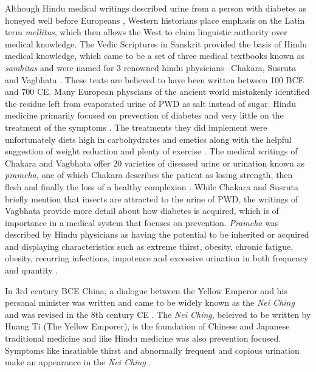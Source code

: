 \documentclass[12pt]{article}
\begin{document}
Although Hindu medical writings described urine from a person with diabetes as honeyed well before Europeans \citep{frank_1957_diabetes}, 
Western historians place emphasis on the Latin term \textit{mellitus}, which then allows the West to claim linguistic authority over medical knowledge. The Vedic Scriptures in Sanskrit provided the basis of Hindu medical knowledge, which came to be a set of three medical textbooks known as \textit{samhitas} and were named for 3 renowned hindu physicians-- Chakara, Susruta and Vagbhata \citep{frank_1957_diabetes}. These texts are believed to have been written between 100 BCE and 700 CE.  Many European physcians of the ancient world mistakenly identified the residue left from evaporated urine of PWD as salt instead of sugar. Hindu medicine primarily focused on prevention of diabetes and very little on the treatment of the symptoms \citep{frank_1957_diabetes}. The treatments they did implement were unfortunately diets high in carbohydrates and emetics along with the helpful suggestion of weight reduction and plenty of exercise \citep{sanders_2001_philatelic}. The medical writings of Chakara and Vagbhata offer 20 varieties of diseased urine or urination known as \textit{prameha}, one of which Chakara describes the patient as losing strength, then flesh and finally the loss of a healthy complexion \citep{frank_1957_diabetes}. While Chakara and Susruta briefly mention that insects are attracted to the urine of PWD, the writings of Vagbhata provide more detail about how diabetes is acquired, which is of importance in a medical system that focuses on prevention. \textit{Prameha} was described by Hindu physicians as having the potential to be inherited or acquired and displaying characteristics \citep{frank_1957_diabetes} such as extreme thirst, obesity, chronic fatigue, obesity, recurring infections, impotence and excessive urination in both frequency and quantity \citep{frank_1957_diabetes}. 

In 3rd century BCE China, a dialogue between the Yellow Emperor and his personal minister was written and came to be widely known as the \textit{Nei Ching} and was revised in the 8th century CE \citep{veith_1950_huang}. The \textit{Nei Ching}, beleived to be written by Huang Ti (The Yellow Emporer), is the foundation of Chinese and Japanese traditional medicine and like Hindu medicine was also prevention focused. Symptoms like insatiable thirst and abnormally frequent and copious urination make an appearance in the \textit{Nei Ching} \citep{veith_1950_huang}. 
\end{document}

